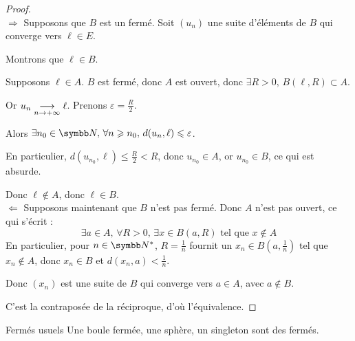 
\begin{proof}~\\
    $\Rightarrow$ Supposons que $B$ est un fermé.
    Soit $(u_n)$ une suite d'éléments de $B$ qui converge vers $\ell \in E$.

    Montrons que $\ell \in B$.

    Supposons $\ell \in A$. $B$ est fermé, donc $A$ est ouvert, donc $\exists R > 0, \, B(\ell, R) \subset A$.

    Or $u_n \underset{n \to +\infty}{\longrightarrow} \ell$. Prenons $\varepsilon = \frac R 2$. 

    Alors $\exists n_0 \in \N, \, \forall n \geqslant n_0, \, d(u_{n}, \ell) \leqslant \varepsilon$. 

    En particulier, $d(u_{n_0}, \ell) \leqslant \frac R 2 < R$, donc $u_{n_0} \in A$, or $u_{n_0} \in B$, ce qui est absurde.

    Donc $\ell \not \in A$, donc $\ell \in B$. \\

    $\Leftarrow$ Supposons maintenant que $B$ n'est pas fermé. Donc $A$ n'est pas ouvert, ce qui s'écrit : 
    \[\exists a \in A, \, \forall R > 0, \, \exists x \in B(a, R) \text{ tel que } x \not \in A\]
    En particulier, pour $n \in \N^*$, $R = \frac 1 n$ fournit un $x_n \in B\left(a, \frac 1 n\right)$ tel que $x_n \not \in A$, donc $x_n \in B$ 
    et $d(x_n, a) < \frac 1 n$.

    Donc $(x_n)$ est une suite de $B$ qui converge vers $a \in A$, avec $a \not \in B$.

    C'est la contraposée de la réciproque, d'où l'équivalence. 
\end{proof}

\begin{proposition}{Fermés usuels}{}
    Une boule fermée, une sphère, un singleton sont des fermés. 
\end{proposition}


